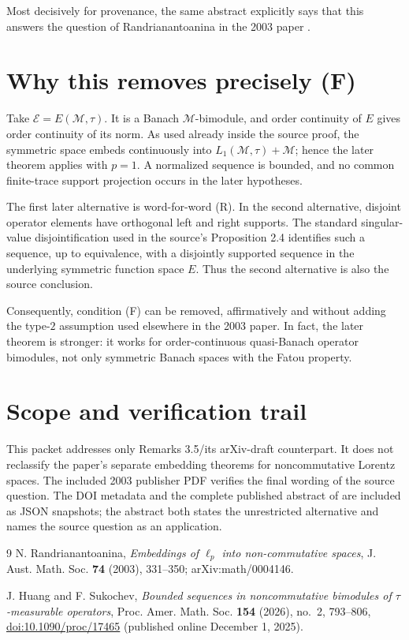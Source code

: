 \documentclass[11pt]{article}
\newcommand{\M}{\mathcal M}
\newcommand{\Ecal}{\mathcal E}
\begin{document}
Most decisively for provenance, the same abstract explicitly says that this
answers the question of Randrianantoanina in the 2003 paper \cite{HS}.

\section*{Why this removes precisely (F)}
Take $\Ecal=E(\M,\tau)$.  It is a Banach $\M$-bimodule, and order continuity
of $E$ gives order continuity of its norm.  As used already inside the source
proof, the symmetric space embeds continuously into
$L_1(\M,\tau)+\M$; hence the later theorem applies with $p=1$.  A normalized
sequence is bounded, and no common finite-trace support projection occurs in
the later hypotheses.

The first later alternative is word-for-word (R).  In the second alternative,
disjoint operator elements have orthogonal left and right supports.  The
standard singular-value disjointification used in the source's Proposition
2.4 identifies such a sequence, up to equivalence, with a disjointly
supported sequence in the underlying symmetric function space $E$.  Thus the
second alternative is also the source conclusion.

Consequently, condition (F) can be removed, affirmatively and without adding
the type-$2$ assumption used elsewhere in the 2003 paper.  In fact, the later
theorem is stronger: it works for order-continuous quasi-Banach operator
bimodules, not only symmetric Banach spaces with the Fatou property.

\section*{Scope and verification trail}
This packet addresses only Remarks 3.5/its arXiv-draft counterpart.  It does
not reclassify the paper's separate embedding theorems for noncommutative
Lorentz spaces.  The included 2003 publisher PDF verifies the final wording
of the source question.  The DOI metadata and the complete published abstract
of \cite{HS} are included as JSON snapshots; the abstract both states the
unrestricted alternative and names the source question as an application.

\begin{thebibliography}{9}
N. Randrianantoanina,
\emph{Embeddings of $\ell_p$ into non-commutative spaces},
J. Aust. Math. Soc. \textbf{74} (2003), 331--350;
arXiv:math/0004146.

J. Huang and F. Sukochev,
\emph{Bounded sequences in noncommutative bimodules of
$\tau$-measurable operators},
Proc. Amer. Math. Soc. \textbf{154} (2026), no.~2, 793--806,
\href{https://doi.org/10.1090/proc/17465}{doi:10.1090/proc/17465}
(published online December 1, 2025).
\end{thebibliography}
\end{document}
